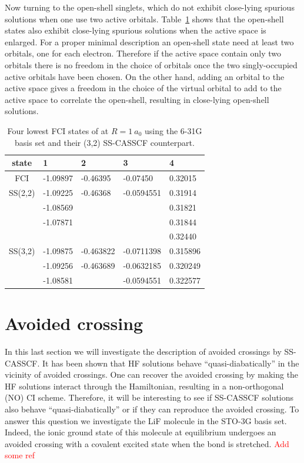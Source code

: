 \documentclass[aps,prb,reprint,showkeys,superscriptaddress]{revtex4-1}
\newcommand{\todo}[1]{\textcolor{red}{#1}}
\begin{document}
Now turning to the open-shell singlets, which do not exhibit close-lying spurious solutions when one use two active orbitals.
Table~\ref{tab:tab_3} shows that the open-shell states also exhibit close-lying spurious solutions when the active space is enlarged.
For a proper minimal description an open-shell state need at least two orbitals, one for each electron.
Therefore if the active space contain only two orbitals there is no freedom in the choice of orbitals once the two singly-occupied active orbitals have been chosen.
On the other hand, adding an orbital to the active space gives a freedom in the choice of the virtual orbital to add to the active space to correlate the open-shell, resulting in close-lying open-shell solutions.

\begin{table}
  \caption{Four lowest FCI states of  at $R=1~a_0$ using the 6-31G basis set and their (3,2) SS-CASSCF counterpart.}
  \begin{ruledtabular}
    \label{tab:tab_3}
    \begin{tabular}{cllll}
      state & 1  & 2 & 3 & 4 \\
      \hline
      FCI & -1.09897 & -0.46395 & -0.07450 & 0.32015 \\
      \hline
      SS(2,2) & -1.09225 & -0.46368 & -0.0594551 & 0.31914 \\
            & -1.08569 &  &  & 0.31821 \\
            & -1.07871 &  &  & 0.31844 \\
            &  &  &  & 0.32440 \\
      \hline
      SS(3,2) & -1.09875 & -0.463822 & -0.0711398 & 0.315896 \\
            & -1.09256 & -0.463689 & -0.0632185 & 0.320249 \\
            & -1.08581 &  & -0.0594551 & 0.322577 \\
    \end{tabular}
  \end{ruledtabular}
\end{table}

\section{Avoided crossing}
\label{sec:avoided}

In this last section we will investigate the description of avoided crossings by SS-CASSCF.
It has been shown that HF solutions behave ``quasi-diabatically'' in the vicinity of avoided crossings. \cite{Thom_2009}
One can recover the avoided crossing by making the HF solutions interact through the Hamiltonian, resulting in a non-orthogonal (NO) CI scheme. \cite{Burton_2019}
Therefore, it will be interesting to see if SS-CASSCF solutions also behave ``quasi-diabatically'' or if they can reproduce the avoided crossing.
To answer this question we investigate the LiF molecule in the STO-3G basis set.
Indeed, the ionic ground state of this molecule at equilibrium undergoes an avoided crossing with a covalent excited state when the bond is stretched. \cite{Thom_2009,Mahler_2021} \todo{Add some ref}
\end{document}
